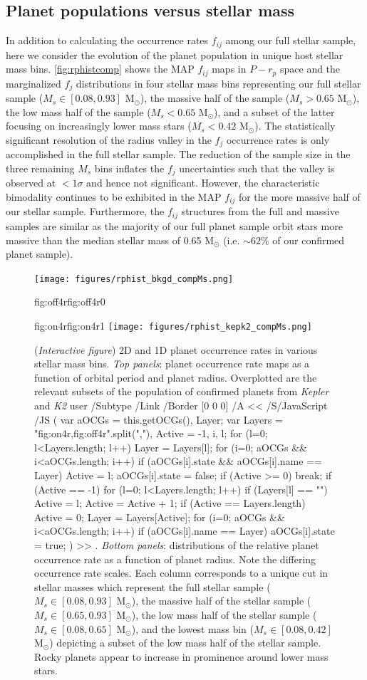\documentclass[twocolumn]{emulateapj}
\newcommand{\kepler}[1]{\emph{Kepler}#1}
\newcommand{\ktwo}[1]{\emph{K2}#1}
\newcommand{\cdbox}[1]{%
  \colorlet{currentcolor}{.}%
  {\color{Blue1}%
    \dbox{\color{currentcolor}#1}}%
}
\newcommand{\ToggleLayer}[2]{%
  \leavevmode
  \pdfstartlink user {
    /Subtype /Link
    /Border [0 0 0]%
    /A <<
      /S/JavaScript
      /JS (
         var aOCGs = this.getOCGs(), Layer;
         var Layers = "#1".split(","), Active = -1, i, l;
         for (l=0; l<Layers.length; l++) {
           Layer = Layers[l];
           for (i=0; aOCGs && i<aOCGs.length; i++) {
             if (aOCGs[i].state && aOCGs[i].name == Layer) {
               Active = l;
               aOCGs[i].state = false;
             }
           }
           if (Active >= 0) break;
         }
         if (Active == -1) {
           for (l=0; l<Layers.length; l++) {
             if (Layers[l] == "") Active = l;
           }
         }
         Active = Active + 1;
         if (Active == Layers.length) Active = 0;
         Layer = Layers[Active];
         for (i=0; aOCGs && i<aOCGs.length; i++) {
           if (aOCGs[i].name == Layer) aOCGs[i].state = true;
         }
      )
    >>
  }#2%
  \pdfendlink
}
\begin{document}
\subsection{Planet populations versus stellar mass} \label{sect:Msbin}
In addition to calculating the occurrence rates $f_{ij}$ among our full stellar sample, here we consider
the evolution of the planet population in unique host stellar mass bins. \autoref{fig:rphistcomp} shows
the MAP $f_{ij}$ maps in $P-r_p$ space and the marginalized $f_j$ distributions in four stellar mass bins
representing our full stellar sample
($M_s \in [0.08,0.93]$ M$_{\odot}$), the massive half of the sample ($M_s>0.65$ M$_{\odot}$),  
the low mass half of the sample ($M_s<0.65$ M$_{\odot}$), and a subset of the latter focusing on
increasingly lower mass stars ($M_s<0.42$ M$_{\odot}$). The statistically significant resolution of the
radius valley in the $f_j$ occurrence rates is only accomplished in the full stellar sample. The reduction
of the sample size in the three remaining $M_s$ bins inflates the $f_j$ uncertainties such that the valley
is observed at $<1\sigma$ and hence not significant. However, the characteristic bimodality continues to be
exhibited in the
MAP $f_{ij}$ for the more massive half of our stellar sample. Furthermore, the $f_{ij}$ structures from
the full and massive samples are similar
as the majority of our full planet sample orbit stars more massive than the median stellar mass of 0.65
M$_{\odot}$ (i.e. $\sim 62$\% of our confirmed planet sample).

\begin{figure}
  \centering
  \texttt{[image: figures/rphist\_bkgd\_compMs.png]}%
  \hspace{-.98\hsize}%
  \begin{ocg}{fig:off4r}{fig:off4r}{0}%
  \end{ocg}%
  \begin{ocg}{fig:on4r}{fig:on4r}{1}%
  \texttt{[image: figures/rphist\_kepk2\_compMs.png]}%
  \end{ocg}
  \hspace{-.98\hsize}%
  \caption{(\emph{Interactive figure}) 2D and 1D planet occurrence rates in various stellar mass bins. \emph{Top panels}: planet occurrence
    rate maps as a function of orbital period and planet radius. Overplotted are the relevant subsets of the
    population of confirmed planets from \kepler{} and
    \ktwo{} \ToggleLayer{fig:on4r,fig:off4r}{\protect\cdbox{(\emph{small circles and diamonds})}}.
    \emph{Bottom panels}: distributions of the relative
    planet occurrence rate as a function of planet radius. Note the differing occurrence rate scales.
    Each column corresponds to a unique cut in stellar masses
    which represent the full stellar sample ($M_s \in [0.08,0.93]$ M$_{\odot}$), the massive half of the stellar sample
    ($M_s \in [0.65,0.93]$ M$_{\odot}$), the low mass half of the stellar sample ($M_s \in [0.08,0.65]$ M$_{\odot}$),
    and the lowest mass bin ($M_s \in [0.08,0.42]$ M$_{\odot}$) depicting a subset of the low mass half of the stellar
    sample. Rocky planets appear to increase in prominence around lower mass stars.}
  \label{fig:rphistcomp}
\end{figure}
\end{document}
